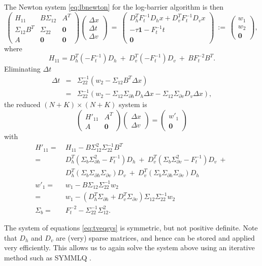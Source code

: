 \documentclass{article}
\newcommand{\bpm}{\left(\begin{matrix}}
\newcommand{\epm}{\end{matrix}\right)}
\newcommand{\dx}{\Delta x}
\newcommand{\dt}{\Delta t}
\newcommand{\dv}{\Delta v}
\newcommand{\<}{\langle}
\renewcommand{\>}{\rangle}
\newcommand{\vzero}{\mathbf{0}}
\begin{document}
The Newton system \eqref{eq:lbnewton} for the log-barrier algorithm is then
\[
\bpm H_{11} & B\Sigma_{12} & A^T \\ 
\Sigma_{12}B^T & \Sigma_{22} & \vzero \\
A & \vzero & \vzero \epm
\bpm \dx \\ \dt \\ \dv \epm ~=~
\bpm  D_h^T F_t^{-1} D_h x + D_v^T F_t^{-1} D_vx \\ 
-\tau\mathbf{1} - F_{t}^{-1}t \\ 
\vzero \epm ~:= ~
\bpm w_1 \\ w_2 \\ \vzero \epm,
\]
where 
\[
H_{11} = D_h^T(-F_t^{-1})D_h ~+~ D_v^T(-F_t^{-1})D_v ~+~ B F_t^{-2}B^T.
\]
Eliminating $\dt$
\begin{eqnarray*}
\dt & = & \Sigma_{22}^{-1}(w_2 - \Sigma_{12}B^T\dx) \\
 & = & \Sigma_{22}^{-1}(w_2 - \Sigma_{12}\Sigma_{\partial h}D_h\dx - \Sigma_{12}\Sigma_{\partial v}D_v\dx),
\end{eqnarray*}
the reduced $(N+K)\times (N+K)$ system is
\begin{equation}
\label{eq:tveqsys}
\bpm H'_{11} & A^T \\ A & \vzero \epm
\bpm \dx \\ \dv \epm = 
\bpm w'_1 \\ \vzero \epm
\end{equation}
with
\begin{align*}
H'_{11} = ~& H_{11} - B\Sigma^2_{12}\Sigma_{22}^{-1}B^T \\
= ~& D_h^T(\Sigma_b\Sigma^2_{\partial h}-F_t^{-1})D_h ~+~
D_v^T(\Sigma_b\Sigma^2_{\partial v}-F_t^{-1})D_v ~+~\\
~& D_h^T(\Sigma_b\Sigma_{\partial h}\Sigma_{\partial v})D_v ~+~
D_v^T(\Sigma_b\Sigma_{\partial h}\Sigma_{\partial v})D_h\\
w'_1 = ~& w_1 - B\Sigma_{12}\Sigma_{22}^{-1}w_2 \\
 = ~& w_1 - (D_h^T\Sigma_{\partial h} + D_v^T\Sigma_{\partial v} )\Sigma_{12}\Sigma_{22}^{-1}w_2 \\
\Sigma_b = ~& F_t^{-2} - \Sigma_{22}^{-1}\Sigma_{12}^2. 
\end{align*}

The system of equations \eqref{eq:tveqsys} is symmetric, but not positive definite.
Note that $D_h$ and $D_v$ are (very) sparse matrices, and hence can be stored and applied very efficiently.  This allows us to again solve the system above using an iterative method such as SYMMLQ \cite{paige75so}.
\end{document}
